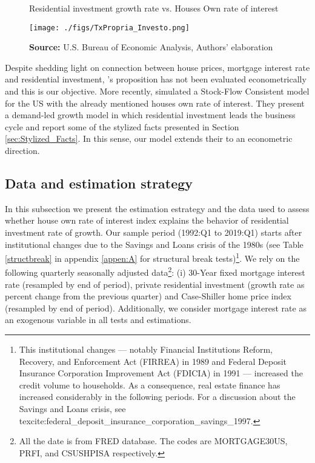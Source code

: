 \documentclass[12pt, a4paper]{article}
\begin{document}
\begin{figure}[htb]
	\centering
	\caption{Residential investment growth rate vs. Houses Own rate of interest}
	\label{propria_investo}
	\texttt{[image: ./figs/TxPropria\_Investo.png]}
	\caption*{\textbf{Source:} U.S. Bureau of Economic Analysis, Authors' elaboration}
\end{figure}

Despite shedding light on connection between house prices, mortgage interest rate and residential investment, \citeauthor*{teixeira_crescimento_2015}'s \citeyear{teixeira_crescimento_2015} proposition has not been evaluated econometrically and this is our objective.
More recently, \textcite{petrini_2021_TD} simulated a Stock-Flow Consistent model for the US with the already mentioned houses own rate of interest.
They present a demand-led growth model in which residential investment leads the business cycle and report some of the stylized facts presented in Section \ref{sec:Stylized_Facts}.
In this sense, our model extends their to an econometric direction.

\subsection{Data and estimation strategy}
\label{sec:org9ed806e}
\label{sec:estimation}

In this subsection we present the estimation estrategy and the data used to assess whether house own rate of interest index explains the behavior of residential investment rate of growth.
Our sample period (1992:Q1 to 2019:Q1) starts after institutional changes due to the Savings and Loans crisis of the 1980s (see Table \ref{structbreak} in appendix \ref{appen:A} for structural break tests)\footnote{This institutional changes --- notably Financial Institutions Reform, Recovery, and Enforcement Act (FIRREA) in 1989 and Federal Deposit Insurance Corporation Improvement Act  (FDICIA) in 1991 --- increased the credit volume to households. As a consequence, real estate finance has increased considerably in the following periods. For a discussion about the Savings and Loans crisis, see texcite:federal\_deposit\_insurance\_corporation\_savings\_1997.}.
We rely on the following  quarterly seasonally adjusted data\footnote{All the date is from FRED database. The codes are MORTGAGE30US, PRFI, and CSUSHPISA respectively.}: (i) 30-Year fixed mortgage interest rate (resampled by end of period), private residential investment (growth rate as percent change from the previous quarter) and Case-Shiller home price index
(resampled by end of period).
Additionally, we consider mortgage interest rate as an exogenous variable in all tests and estimations.
\end{document}
